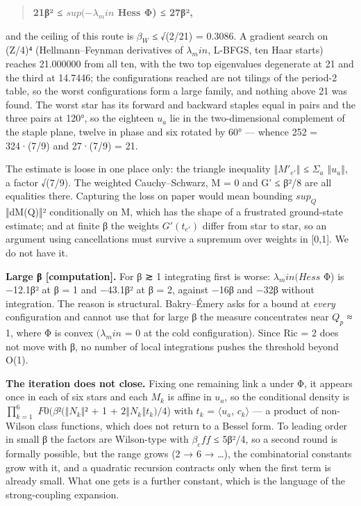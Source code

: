 \documentclass[11pt,a4paper]{article}
\theoremstyle{named}
\begin{document}
\begin{quote}
\textbf{21β² ≤ $sup(−λ_min$ Hess Φ) ≤ 27β²,}
\end{quote}
and the ceiling of this route is $β_W$ ≤ √(2/21) = 0.3086. A gradient search on (Z/4)⁴ (Hellmann–Feynman derivatives of $λ_min$, L-BFGS, ten Haar starts) reaches 21.000000 from all ten, with the two top eigenvalues degenerate at 21 and the third at 14.7446; the configurations reached are not tilings of the period-2 table, so the worst configurations form a large family, and nothing above 21 was found. The worst star has its forward and backward staples equal in pairs and the three pairs at 120°, so the eighteen $u_a$ lie in the two-dimensional complement of the staple plane, twelve in phase and six rotated by 60° — whence 252 = 324·(7/9) and 27·(7/9) = 21.

The estimate is loose in one place only: the triangle inequality $‖M'_{e'}‖$ ≤ $Σ_a$ $‖u_a‖$, a factor √(7/9). The weighted Cauchy–Schwarz, M = 0 and G' ≤ β²/8 are all equalities there. Capturing the loss on paper would mean bounding $sup_Q$ ‖dM(Q)‖² conditionally on M, which has the shape of a frustrated ground-state estimate; and at finite β the weights $G'(t_{e'})$ differ from star to star, so an argument using cancellations must survive a supremum over weights in [0,1]. We do not have it.

\textbf{Large β [computation].} For β ≳ 1 integrating first is worse: $λ_min(Hess$ Φ) is −12.1β² at β = 1 and −43.1β² at β = 2, against −16β and −32β without integration. The reason is structural. Bakry–Émery asks for a bound at \textit{every} configuration and cannot use that for large β the measure concentrates near $Q_p$ ≈ 1, where Φ is convex $(λ_min$ = 0 at the cold configuration). Since Ric = 2 does not move with β, no number of local integrations pushes the threshold beyond O(1).

\textbf{The iteration does not close.} Fixing one remaining link a under Φ, it appears once in each of six stars and each $M_k$ is affine in $u_a$, so the conditional density is $∏_{k=1}^{6}$ $F0(β²(‖N_k‖²$ + 1 + $2‖N_k‖t_k)/4$) with $t_k$ = $⟨u_a$, $c_k⟩$ — a product of non-Wilson class functions, which does not return to a Bessel form. To leading order in small β the factors are Wilson-type with $β_eff$ ≤ 5β²/4, so a second round is formally possible, but the range grows (2 → 6 → …), the combinatorial constants grow with it, and a quadratic recursion contracts only when the first term is already small. What one gets is a further constant, which is the language of the strong-coupling expansion.
\end{document}
